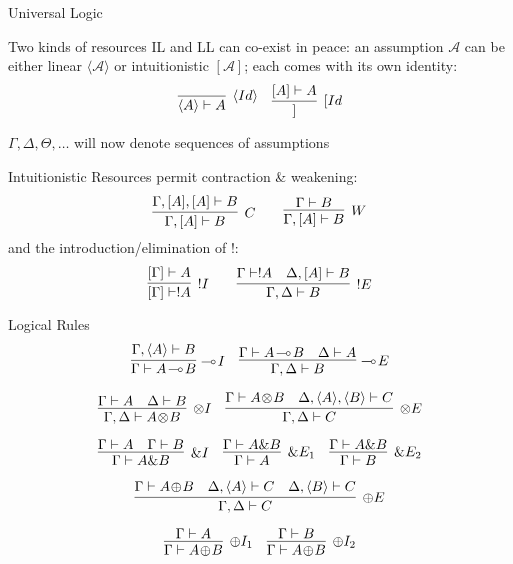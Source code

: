 \documentclass{beamer}
\newcommand{\li}{\!\multimap\!}
\newcommand{\lotimes}{\!\otimes\!}
\newcommand{\loplus}{\!\oplus\!}
\newcommand{\lin}[1]{\langle#1\rangle}
\newcommand{\lint}[1]{[#1]}
\begin{document}
\begin{frame}{Universal Logic}
	\small	
	
	\begin{block}{Two kinds of resources}
		IL and LL can co-exist in peace:
		an \alert{assumption} $\mathcal{A}$ can be either \alert{linear} $\lin{\mathcal{A}}$ or \alert{intuitionistic} $\lint{\mathcal{A}}$; each comes with its own identity:
		\[
		\vcenter{\infer[\lin{Id}]{\lin{A} \vdash A}{}}  \quad \vcenter{\infer[\lint{Id}]{\lint{A} \vdash A}{}}
		\]
		\begin{flushright}
			$\Gamma, \Delta, \Theta, \dots$ will now denote \alert{sequences of assumptions}\\
		\end{flushright}
	\end{block}
	\pause
	
	\begin{block}{Intuitionistic Resources}
		permit contraction \& weakening:
		\[
			\vcenter{\infer[C]{\Gamma, \lint{A} \vdash B}{\Gamma, \lint{A}, \lint{A} \vdash B}}
			\quad\quad
			\vcenter{\infer[W]{\Gamma, \lint{A} \vdash B}{\Gamma \vdash B}}
		\]
		\pause
		and the introduction/elimination of !:
		\[
			\vcenter{\infer[!I]{\lint{\Gamma} \vdash !A}{\lint{\Gamma} \vdash A}}
			\quad\quad
			\vcenter{\infer[!E]{\Gamma, \Delta \vdash B}{
				\Gamma \vdash !A
				&
				\Delta, \lint{A} \vdash B
			}
			}
		\]
	\end{block}
\end{frame}

\begin{frame}{Logical Rules}
	\[
	\infer[\li I]{\Gamma \vdash A \li B}{\Gamma, \lin{A} \vdash B}
	\quad
    \infer[\li E]{\Gamma, \Delta \vdash B}
	{\Gamma \vdash A \li B
	&
	\Delta \vdash A}
	\]
	\pause

	\[
	\infer[\otimes I]{\Gamma, \Delta \vdash A \lotimes B}{
		\Gamma \vdash A
		&
		\Delta \vdash B
	}
	\quad
    \infer[\otimes E]{\Gamma, \Delta \vdash C }
	{\Gamma \vdash A \lotimes B
	&
	\Delta, \lin{A}, \lin{B} \vdash C}
	\]
	\pause
	
	\[
	\infer[\&I]{\Gamma \vdash A\&B}{
	\Gamma \vdash A
	& 
	\Gamma \vdash B
	}
	\quad
	\infer[\&E_1]{\Gamma \vdash A}{
		\Gamma \vdash A \& B
	}
	\quad
	\infer[\&E_2]{\Gamma \vdash B}{
		\Gamma \vdash A \& B
	}
	\]
	\pause
	
	\[
	\infer[\oplus E]{\Gamma, \Delta \vdash C}{
		\Gamma \vdash A\loplus B
		&
		\Delta, \lin{A} \vdash  C
		&
		\Delta, \lin{B} \vdash C
	}
	\]
	
	\[
	\infer[\oplus I_1]{\Gamma \vdash A \loplus B}{
		\Gamma \vdash A
	}
	\quad
	\infer[\oplus I_2]{\Gamma \vdash A \loplus B}{
		\Gamma \vdash B
	}
	\]
	\vfill
\end{frame}
\end{document}
